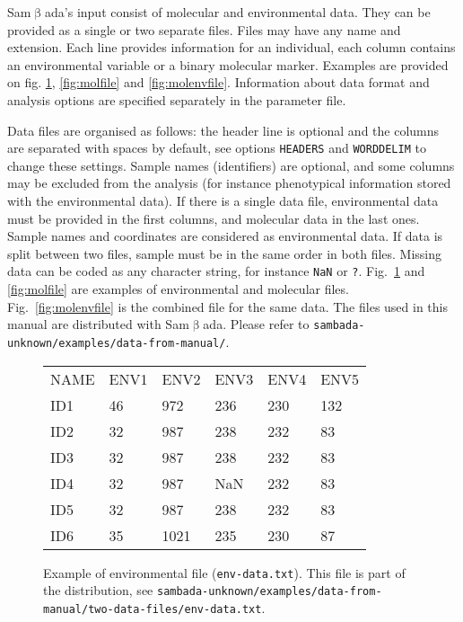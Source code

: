 \documentclass[a4paper,11pt]{article}
\newcommand{\versionnumber}{unknown}
\newcommand{\smb}{\textsf{Sam$\upbeta$ada}}
\newcommand{\prog}[1]{\texttt{#1}}
\newcommand{\pathtodatafrommanual}{\texttt{sambada-\versionnumber/examples/data-from-manual/}}
\newcommand{\pathtotwodatafiles}{\pathtodatafrommanual\texttt{two-data-files/}}
\begin{document}
\smb's input consist of molecular and environmental data.
They can be provided as a single or two separate files.
Files may have any name and extension. 
Each line provides information for an individual, each column contains an environmental variable or a binary molecular marker.
Examples are provided on fig. \ref{fig:envfile}, \ref{fig:molfile} and \ref{fig:molenvfile}.
Information about data format and analysis options are specified separately in the parameter file.

Data files are organised as follows: the header line is optional and the columns are separated with spaces by default, see options \texttt{HEADERS} and \texttt{WORDDELIM} to change these settings.
Sample names (identifiers) are optional, and some columns may be excluded from the analysis (for instance phenotypical information stored with the environmental data).
If there is a single data file, environmental data must be provided in the first columns, and molecular data in the last ones.
Sample names and coordinates are considered as environmental data.
If data is split between two files, sample must be in the same order in both files.
Missing data can be coded as any character string, for instance \prog{NaN} or \prog{?}.
Fig.~\ref{fig:envfile} and \ref{fig:molfile} are examples of environmental and molecular files.
Fig.~\ref{fig:molenvfile} is the combined file for the same data.
The files used in this manual are distributed with \smb. 
Please refer to \pathtodatafrommanual.

\begin{figure}[htbp]

\begin{center}
		\begin{mdframed}[backgroundcolor=white,userdefinedwidth=9.5cm,align=center]
		\begin{tabular}{llllll}
NAME&	ENV1	&ENV2	&ENV3	&ENV4	&ENV5	\\
ID1	&	46	&	972	&	236	&	230	&	132		\\
ID2	&	32	&	987	&	238	&	232	&	83		\\
ID3	&	32	&	987	&	238	&	232	&	83		\\
ID4	&	32	&	987	&	NaN	&	232	&	83		\\
ID5	&	32	&	987	&	238	&	232	&	83		\\
ID6	&	35	&	1021	&	235	&	230	&	87		\\		
\end{tabular}
	\end{mdframed}
	\end{center}
	\caption{Example of environmental file (\texttt{env-data.txt}).
	This file is part of the distribution, see 
	\pathtotwodatafiles\texttt{env-data.txt}.
	}
	\label{fig:envfile}
\end{figure}
\end{document}
